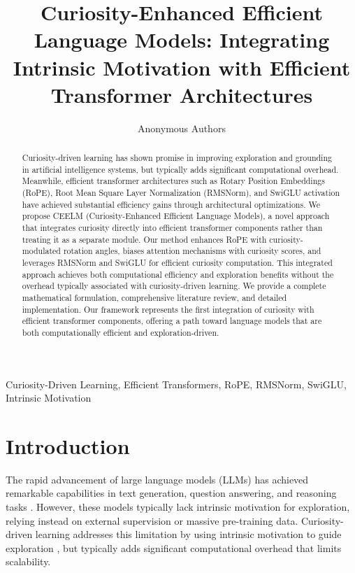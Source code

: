 \documentclass{IEEEtran}
\title{Curiosity-Enhanced Efficient Language Models: Integrating Intrinsic Motivation with Efficient Transformer Architectures}
\author{Anonymous Authors}
\date{}
\begin{document}
\maketitle

\begin{abstract}
Curiosity-driven learning has shown promise in improving exploration and grounding in artificial intelligence systems, but typically adds significant computational overhead. Meanwhile, efficient transformer architectures such as Rotary Position Embeddings (RoPE), Root Mean Square Layer Normalization (RMSNorm), and SwiGLU activation have achieved substantial efficiency gains through architectural optimizations. We propose CEELM (Curiosity-Enhanced Efficient Language Models), a novel approach that integrates curiosity directly into efficient transformer components rather than treating it as a separate module. Our method enhances RoPE with curiosity-modulated rotation angles, biases attention mechanisms with curiosity scores, and leverages RMSNorm and SwiGLU for efficient curiosity computation. This integrated approach achieves both computational efficiency and exploration benefits without the overhead typically associated with curiosity-driven learning. We provide a complete mathematical formulation, comprehensive literature review, and detailed implementation. Our framework represents the first integration of curiosity with efficient transformer components, offering a path toward language models that are both computationally efficient and exploration-driven.
\end{abstract}

\begin{IEEEkeywords}
Curiosity-Driven Learning, Efficient Transformers, RoPE, RMSNorm, SwiGLU, Intrinsic Motivation
\end{IEEEkeywords}

\section{Introduction}

The rapid advancement of large language models (LLMs) has achieved remarkable capabilities in text generation, question answering, and reasoning tasks \cite{brown2020}. However, these models typically lack intrinsic motivation for exploration, relying instead on external supervision or massive pre-training data. Curiosity-driven learning addresses this limitation by using intrinsic motivation to guide exploration \cite{oudeyer2007}, but typically adds significant computational overhead that limits scalability.
\end{document}
